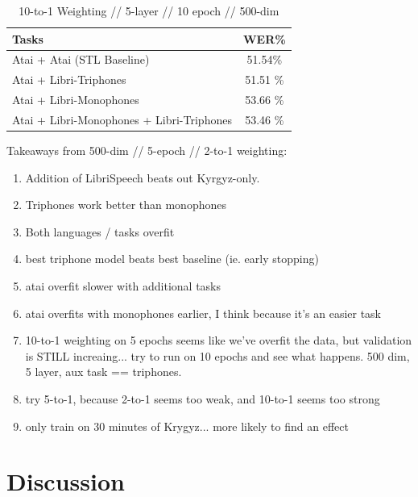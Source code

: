\documentclass[a4paper]{article}
\begin{document}
\begin{table}[!htbp]
  \centering
    \caption{10-to-1 Weighting // 5-layer // 10 epoch // 500-dim}
  \begin{adjustbox}{width=.45\textwidth}
    \begin{tabular}{lc}
      \toprule
      \textbf{Tasks} & \textbf{WER\%}\\
      \midrule
      Atai + Atai (STL Baseline) &  51.54\% \\
      Atai + Libri-Triphones & 51.51 \%  \\
      Atai + Libri-Monophones & 53.66 \% \\
      Atai + Libri-Monophones + Libri-Triphones & 53.46 \%  \\
      \bottomrule
    \end{tabular}
    \label{table:data}
  \end{adjustbox}
\end{table}



Takeaways from 500-dim // 5-epoch // 2-to-1 weighting:

\begin{enumerate}
\item Addition of LibriSpeech beats out Kyrgyz-only.
\item Triphones work better than monophones
\item Both languages / tasks overfit
\item best triphone model beats best baseline (ie. early stopping)
\item atai overfit slower with additional tasks
\item atai overfits with monophones earlier, I think because it's an easier task
\item 10-to-1 weighting on 5 epochs seems like we've overfit the data, but validation is STILL increaing... try to run on 10 epochs and see what happens. 500 dim, 5 layer, aux task == triphones.
\item try 5-to-1, because 2-to-1 seems too weak, and 10-to-1 seems too strong
  \item only train on 30 minutes of Krygyz... more likely to find an effect
\end{enumerate}




\section{Discussion}
\end{document}
